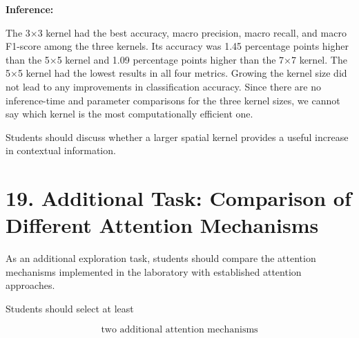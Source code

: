 \documentclass[10pt]{article}
\begin{document}
\begin{center}




\begin{table}[H]
\centering
\caption{Classification Performance for Different Spatial Attention Kernel Sizes}
\label{tab:kernel_size_results}
\end{table}

\textbf{Inference:}

The 3×3 kernel had the best accuracy, macro precision, macro recall, and macro F1-score among the three kernels. Its accuracy was 1.45 percentage points higher than the 5×5 kernel and 1.09 percentage points higher than the 7×7 kernel. The 5×5 kernel had the lowest results in all four metrics. Growing the kernel size did not lead to any improvements in classification accuracy. Since there are no inference-time and parameter comparisons for the three kernel sizes, we cannot say which kernel is the most computationally efficient one.


\end{center}

Students should discuss whether a larger spatial kernel provides a useful
increase in contextual information.

\section*{19. Additional Task: Comparison of Different Attention Mechanisms}

As an additional exploration task, students should compare the attention
mechanisms implemented in the laboratory with established attention
approaches.

Students should select at least

\[
\boxed{\text{two additional attention mechanisms}}
\]
\end{document}
